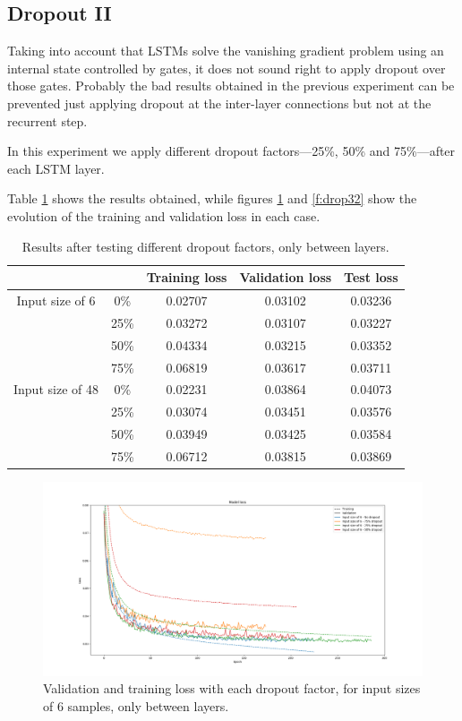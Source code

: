\documentclass[]{article}
\begin{document}
\subsection{Dropout II}

Taking into account that LSTMs solve the vanishing gradient problem using an internal state controlled by gates, it does not sound right to apply dropout over those gates. Probably the bad results obtained in the previous experiment can be prevented just applying dropout at the inter-layer connections but not at the recurrent step.

In this experiment we apply different dropout factors---25\%, 50\% and 75\%---after each LSTM layer.

Table \ref{t:drop3} shows the results obtained, while figures \ref{f:drop31} and \ref{f:drop32} show the evolution of the training and validation loss in each case.

\begin{table}[H]
	\centering
	\begin{tabular}{@{}ccccc@{}}
		\toprule
		&      & Training loss & Validation loss & Test loss \\ \midrule
		Input size of 6  & 0\%  & 0.02707       & 0.03102         & 0.03236   \\
		& 25\% & 0.03272       & 0.03107         & 0.03227   \\
		& 50\% & 0.04334       & 0.03215         & 0.03352   \\
		& 75\% & 0.06819       & 0.03617         & 0.03711   \\
		Input size of 48 & 0\%  & 0.02231       & 0.03864         & 0.04073   \\
		& 25\% & 0.03074       & 0.03451         & 0.03576   \\
		& 50\% & 0.03949       & 0.03425         & 0.03584   \\
		& 75\% & 0.06712       & 0.03815         & 0.03869   \\ \bottomrule
	\end{tabular}
	\caption{Results after testing different dropout factors, only between layers.}
	\label{t:drop3}
\end{table}

\begin{figure}[H]
	\centering
	\includegraphics[width=\textwidth]{drop31}
	\caption{Validation and training loss with each dropout factor, for input sizes of 6 samples, only between layers.}
	\label{f:drop31}
\end{figure}
\end{document}
